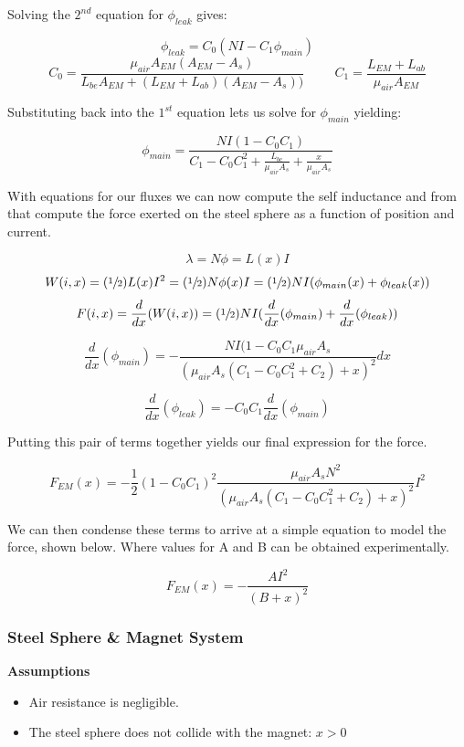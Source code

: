\documentclass{article}
\theoremstyle{plain}
\theoremstyle{definition}
\theoremstyle{remark}
\begin{document}
Solving the $2^{nd}$ equation for $\phi_{leak}$ gives:

$$\phi_{leak} = C_{0}\left( NI-C_{1}\phi_{main} \right)$$ 
$$C_{0} = \frac{\mu_{air} A_{EM} (A_{EM} - A_{s})}{L_{be} A_{EM} + (L_{EM} + L_{ab})(A_{EM} - A_{s}))} \hspace{1cm} 
C_{1} = \frac{L_{EM} + L_{ab}}{\mu_{air} A_{EM}} $$

Substituting back into the $1^{st}$ equation lets us solve for $\phi_{main}$ yielding: 

$$ \phi_{main} = \frac{NI(1-C_{0}C_{1})}{C_{1} - C_{0} C_{1}^2 + \frac{L_{bc}}{\mu_{air} A_{s}} + \frac{x}{\mu_{air} A_{s}}} $$

With equations for our fluxes we can now compute the self inductance and from that compute the force exerted on the steel sphere as a function of position and current.

$$ \lambda = N \phi = L(x) I $$
$$ W(i,x) = (\sfrac{1}{2}) L(x) I^2 = (\sfrac{1}{2}) N \phi(x) I =(\sfrac{1}{2}) N I (\phi_{main}(x) + \phi_{leak}(x))$$
$$ F(i,x) = \frac{d}{dx} (W(i,x) )= (\sfrac{1}{2}) N I ( \frac{d}{dx} (\phi_{main}) + \frac{d}{dx} (\phi_{leak})) $$

$$ \frac{d}{dx}(\phi_{main}) = - \frac{N I (1 - C_{0}C_{1} \mu_{air} A_{s}}{(\mu_{air} A_{s}(C_{1} - C_{0} C_{1}^2 + C_{2}) + x)^2} dx$$

$$ \frac{d}{dx}(\phi_{leak}) = -C_{0} C_{1} \frac{d}{dx}(\phi_{main})$$

Putting this pair of terms together yields our final expression for the force.

$$ F_{EM}(x) = -\frac{1}{2} \left( 1 - C_{0}C_{1} \right)^2 \frac{\mu_{air} A_{s} N^2 }{(\mu_{air} A_{s}(C_{1} - C_{0} C_{1}^2 + C_{2}) + x)^2} I^2 $$

We can then condense these terms to arrive at a simple equation to model the force, shown below.  Where values for A and B can be obtained experimentally.

$$ F_{EM}(x) = -\frac{A I^2}{(B+x)^2} $$

\subsubsection*{Steel Sphere \& Magnet System}
\textbf{Assumptions}
\begin{itemize}
\item Air resistance is negligible.
\item The steel sphere does not collide with the magnet: $x > 0$
\end{itemize}
\end{document}
